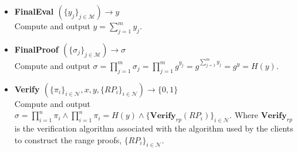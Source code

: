 \begin{algorithm}
\begin{itemize}
\item\textbf{FinalEval $(\{y_j\}_{j\in\mathcal{M}})\xrightarrow[]{}y$}\\
Compute and output $y = \sum_{j=1}^m y_{j}$.

\item\textbf{FinalProof $(\{\sigma_j\}_{j\in\mathcal{M}})\xrightarrow[]{}\sigma$}\\
Compute and output $\sigma = \prod_{j=1}^m \sigma_j = \prod_{j=1}^m g^{y_{j}} =  g^{\sum_{j=1}^m y_{j}}= g^{y}=H(y)$.

\item\textbf{Verify $(\{\pi_i\}_{i\in\mathcal{N}},x,y,\{RP_i\}_{i\in\mathcal{N}})\xrightarrow[]{}\{0,1\}$}\\
Compute and output $\sigma= \prod_{i=1}^n \pi_i \wedge \prod_{i=1}^n \pi_i = H(y)\wedge \{\textbf{Verify}_{rp}(RP_i)\}_{i\in\mathcal{N}}$. Where $\textbf{Verify}_{rp}$ is the verification algorithm associated with the algorithm used by the clients to construct the range proofs, $\{RP_i\}_{i\in\mathcal{N}}$.
\end{itemize}
\label{alg:VAHSS-HSS-RP}
\end{algorithm}

